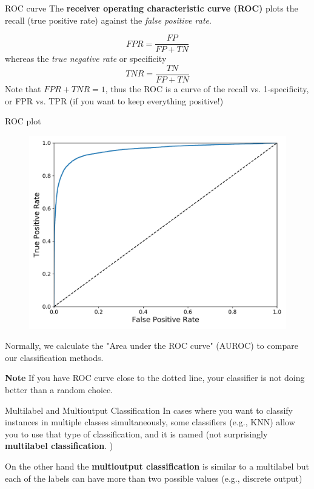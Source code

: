 \documentclass{beamer}
\begin{document}
\begin{frame}{ROC curve}
	The {\bf receiver operating characteristic curve (ROC)} plots the recall (true positive rate) against the {\it false positive rate}. 
	
	\begin{equation*}
		FPR= \frac{FP}{FP+TN}
	\end{equation*}
whereas the {\it true negative rate} or specificity 
\begin{equation*}
	TNR= \frac{TN}{FP+TN}
\end{equation*}
	Note that $FPR+TNR=1$, thus the ROC is a curve of the recall vs. 1-specificity, or FPR vs. TPR (if you want to keep everything positive!)
\end{frame}
\begin{frame}{ROC plot}
\begin{figure}
	\centering
	\includegraphics[scale=0.35]{../../Figures/roc_curve_plot.png}
\end{figure}
Normally, we calculate the "Area under the ROC curve" (AUROC) to compare our classification methods.

{\bf Note} If you have ROC curve close to the dotted line, your classifier is not doing better than a random choice.
\end{frame}
\begin{frame}{Multilabel and Multioutput Classification}
	In cases where you want to classify instances in multiple classes simultaneously, some classifiers (e.g., KNN) allow you to use that type of classification, and it is named (not surprisingly {\bf multilabel classification}. )
	
	On the other hand the {\bf multioutput classification} is similar to a multilabel but each of the labels can have more than two possible values (e.g., discrete output)
\end{frame}
\end{document}
